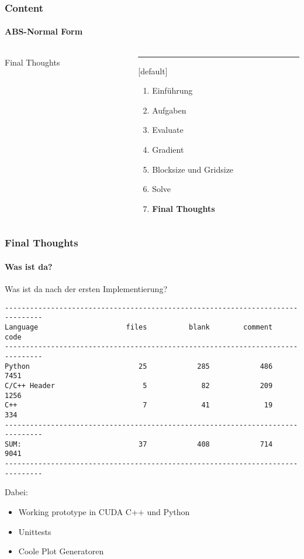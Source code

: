 \begin{frame}
	\frametitle{Content}
	\framesubtitle{ABS-Normal Form}
	\begin{columns}[T] %
		\begin{column}{.48\textwidth}
			
			\begin{center}
				{\Huge Final Thoughts}
			\end{center}
			
		\end{column}%
		\hfill%
		\begin{column}{.48\textwidth}
			\color{blue}\rule{\linewidth}{4pt}
			
			\begin{enumerate}
				\item Einführung
				\item Aufgaben
				\item Evaluate
				\item Gradient
				\item Blocksize und Gridsize
				\item Solve
				\item \textbf{Final Thoughts}
			\end{enumerate}
		\end{column}%
	\end{columns}
\end{frame}
\begin{frame}[fragile]
	\frametitle{Final Thoughts}
	\framesubtitle{Was ist da?}
Was ist da nach der ersten Implementierung?
\pause
\begin{lstlisting}
-------------------------------------------------------------------------------
Language                     files          blank        comment           code
-------------------------------------------------------------------------------
Python                          25            285            486           7451
C/C++ Header                     5             82            209           1256
C++                              7             41             19            334
-------------------------------------------------------------------------------
SUM:                            37            408            714           9041
-------------------------------------------------------------------------------
\end{lstlisting}
\pause
Dabei:
\begin{itemize}
	\item Working prototype in CUDA C++ und Python
	\item Unittests
	\item Coole Plot Generatoren
\end{itemize}
\end{frame}

